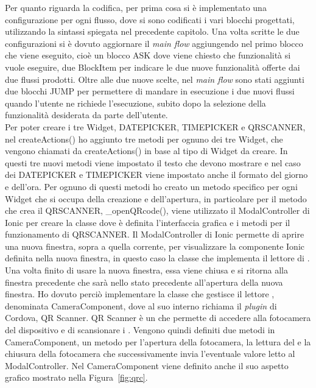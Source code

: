 Per quanto riguarda la codifica, per prima cosa si è implementato una configurazione  per ogni flusso, dove si sono codificati i vari blocchi progettati, utilizzando la sintassi spiegata nel precedente capitolo. Una volta scritte le due configurazioni si è dovuto aggiornare il \emph{main flow} aggiungendo nel primo blocco che viene eseguito, cioè un blocco ASK dove viene chiesto che funzionalità si vuole eseguire, due BlockItem per indicare le due nuove funzionalità offerte dai due flussi prodotti. Oltre alle due nuove scelte, nel \emph{main flow} sono stati aggiunti due blocchi JUMP per permettere di mandare in esecuzione i due nuovi flussi quando l'utente ne richiede l'esecuzione, subito dopo la selezione della funzionalità desiderata da parte dell'utente.\\

Per poter creare i tre Widget, DATEPICKER, TIMEPICKER e QRSCANNER, nel createActions() ho aggiunto tre metodi per ognuno dei tre Widget, che vengono chiamati da createActions() in base al tipo di Widget da creare. In questi tre nuovi metodi viene impostato il testo che devono mostrare e nel caso dei DATEPICKER e TIMEPICKER viene impostato anche il formato del giorno e dell'ora. Per ognuno di questi metodi ho creato un metodo specifico per ogni Widget che si occupa della creazione e dell'apertura, in particolare per il metodo che crea il QRSCANNER, \_openQRcode(), viene utilizzato il ModalController di Ionic per creare la classe dove è definita l'interfaccia grafica e i metodi per il funzionamento di QRSCANNER. Il ModalController di Ionic permette di aprire una nuova finestra, sopra a quella corrente, per visualizzare la componente Ionic definita nella nuova finestra, in questo caso la classe che implementa il lettore di . Una volta finito di usare la nuova finestra, essa viene chiusa e si ritorna alla finestra precedente che sarà nello stato precedente all'apertura della nuova finestra. Ho dovuto perciò implementare la classe che gestisce il lettore , denominata CameraComponent, dove al suo interno richiama il \emph{plugin} di Cordova, QR Scanner. QR Scanner è un  che permette di accedere alla fotocamera del dispositivo e di scansionare i . Vengono quindi definiti due metodi in CameraComponent, un metodo per l'apertura della fotocamera, la lettura del  e la chiusura della fotocamera che successivamente invia l'eventuale valore letto al ModalController. Nel CameraComponent viene definito anche il suo aspetto grafico mostrato nella Figura~\ref{fig:qrc}.\\
 
